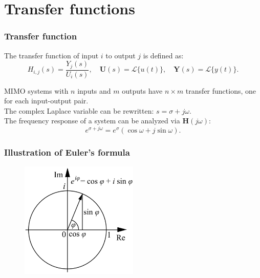 
\section{Transfer functions}

\begin{frame}
\frametitle{Transfer function}
\begin{definition}
The transfer function of input $i$ to output $j$ is defined as:
\begin{equation*}
H_{i,j}(s) = \frac{Y_j(s)}{U_i(s)},\quad \mathbf{U}(s) = \mathcal{L}\{u(t)\},\quad \mathbf{Y}(s) = \mathcal{L}\{y(t)\}.
\end{equation*}
\end{definition}
MIMO systems with $n$ inputs and $m$ outputs have $n\times m$ transfer functions, one for each input-output pair.\\
The complex Laplace variable can be rewritten: $s = \sigma + j\omega$. \\
The frequency response of a system can be analyzed via $\mathbf{H}(j\omega)$:
\begin{equation*}
e^{\sigma + j\omega} = e^\sigma ( \cos \omega + j \sin \omega ).
\end{equation*}
\end{frame}

\begin{frame}
\frametitle{Illustration of Euler's formula}
\begin{figure}
\centering
\includegraphics[width=0.5\textwidth]{euler.png}
\end{figure}
\end{frame}


